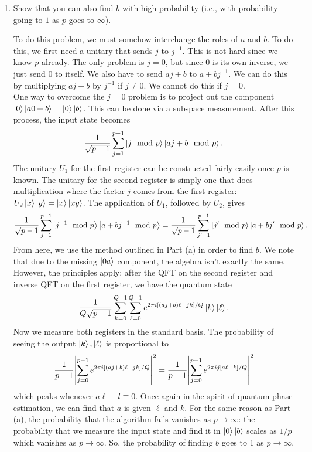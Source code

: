 \documentclass{article}
\theoremstyle{definition}
\newcommand{\f}[2]{\frac{#1}{#2}}
\begin{document}
\begin{enumerate}[label=(\alph*)]
\item Show that you can also find $b$ with high probability (i.e., with probability going to $1$ as $p$ goes to $\infty$). 

\noindent To do this problem, we must somehow interchange the roles of $a$ and $b$. To do this, we first need a unitary that sends $j$ to $j^{-1}$. This is not hard since we know $p$ already. The only problem is $j=0$, but since 0 is its own inverse, we just send $0$ to itself. We also have to send $aj+b$ to $a + bj^{-1}$. We can do this by multiplying $aj+b$ by $j^{-1}$ if $j\neq 0$. We cannot do this if $j=0$. \\

One way to overcome the $j=0$ problem is to project out the component $\ket{0} \ket{a 0 + b} = \ket{0}\ket{b}$. This can be done via a subspace measurement. After this process, the input state becomes
\begin{align*}
	\f{1}{\sqrt{p-1}}\sum_{j=1}^{p-1} \ket{j \mod p} \ket{aj + b \mod p}.
\end{align*}
The unitary $U_1$ for the first register can be constructed fairly easily once $p$ is known. The unitary for the second register is simply one that does multiplication where the factor $j$ comes from the first register: $U_2 \ket{x}\ket{y}= \ket{x}\ket{xy}$.  The application of $U_1$, followed by $U_2$, gives
\begin{align*}
		\f{1}{\sqrt{p-1}}\sum_{j=1}^{p-1} \ket{j^{-1} \mod p} \ket{a + b j^{-1} \mod p} = \f{1}{\sqrt{p-1}}\sum_{j'=1}^{p-1} \ket{j' \mod p} \ket{a + b j' \mod p}.
\end{align*}
From here, we use the method outlined in Part (a) in order to find $b$. We note that due to the missing $\ket{0a}$ component, the algebra isn't exactly the same. However, the principles apply: after the QFT on the second register and inverse QFT on the first register, we have the quantum state
\begin{align*}
	\f{1}{Q\sqrt{p-1}} \sum_{k=0}^{Q-1} \sum_{\ell = 0}^{Q-1} e^{2\pi i [(aj+b)\ell - jk]/Q} \ket{k} \ket{\ell}.
\end{align*}
Now we measure both registers in the standard basis. The probability of seeing the output $\ket{k}, \ket{\ell}$ is proportional to 
\begin{align*}
	\f{1}{p-1}\abs{\sum_{j=0}^{p-1} e^{2\pi i [ (aj+b)\ell - jk]  /Q }}^2 =  \f{1}{p-1}	\abs{\sum_{j=0}^{p-1} e^{2\pi i j [ a\ell - k]  /Q }}^2
\end{align*}
which peaks whenever $a\ell - l \equiv 0$. Once again in the spirit of quantum phase estimation, we can find that $a$ is given $\ell$ and $k$. For the same reason as Part (a), the probability that the algorithm fails vanishes as $p\to \infty$: the probability that we measure the input state and find it in $\ket{0}\ket{b}$ scales as $1/p$ which vanishes as $p\to \infty$. So, the probability of finding $b$ goes to 1 as $p\to \infty$. 


\end{enumerate}
\end{document}

